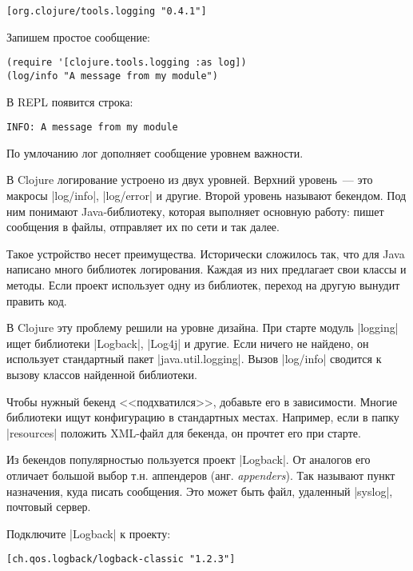 \begin{verbatim}
[org.clojure/tools.logging "0.4.1"]
\end{verbatim}

\noindent
Запишем простое сообщение:

\begin{verbatim}
(require '[clojure.tools.logging :as log])
(log/info "A message from my module")
\end{verbatim}

В REPL появится строка:

\begin{verbatim}
INFO: A message from my module
\end{verbatim}

\noindent
По умлочанию лог дополняет сообщение уровнем важности.

В Clojure логирование устроено из двух уровней. Верхний уровень~--- это макросы
\spverb|log/info|, \spverb|log/error| и другие. Второй уровень называют
бекендом. Под ним понимают Java-библиотеку, которая выполняет основную работу:
пишет сообщения в файлы, отправляет их по сети и так далее.

Такое устройство несет преимущества. Исторически сложилось так, что для Java
написано много библиотек логирования. Каждая из них предлагает свои классы и
методы. Если проект использует одну из библиотек, переход на другую вынудит
править код.

В Clojure эту проблему решили на уровне дизайна. При старте модуль
\spverb|logging| ищет библиотеки \spverb|Logback|, \spverb|Log4j| и другие. Если
ничего не найдено, он использует стандартный пакет
\spverb|java.util.logging|. Вызов \spverb|log/info| сводится к вызову классов
найденной библиотеки.

Чтобы нужный бекенд <<подхватился>>, добавьте его в зависимости. Многие
библиотеки ищут конфигурацию в стандартных местах. Например, если в папку
\spverb|resources| положить XML-файл для бекенда, он прочтет его при старте.

Из бекендов популярностью пользуется проект \spverb|Logback|. От аналогов его
отличает большой выбор т.н. аппендеров (анг. \emph{appenders}). Так называют
пункт назначения, куда писать сообщения. Это может быть файл, удаленный
\spverb|syslog|, почтовый сервер.

Подключите \spverb|Logback| к проекту:

\begin{verbatim}
[ch.qos.logback/logback-classic "1.2.3"]
\end{verbatim}

